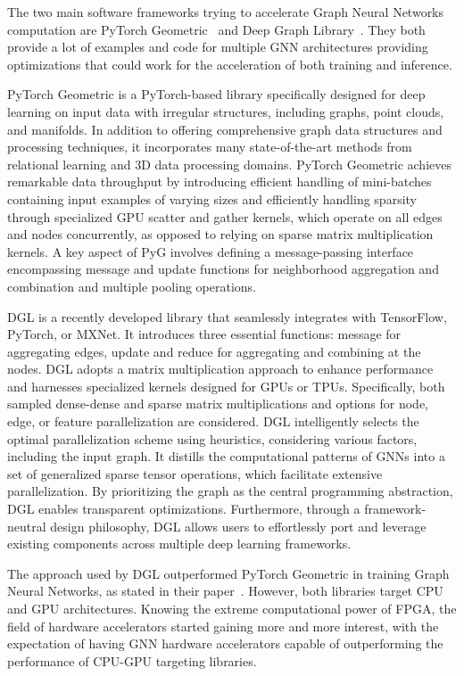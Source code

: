 The two main software frameworks trying to accelerate Graph Neural Networks computation are PyTorch Geometric~\cite{DBLP:journals/corr/abs-1903-02428} and Deep Graph Library~\cite{DBLP:journals/corr/abs-1909-01315}.
They both provide a lot of examples and code for multiple GNN architectures providing optimizations that could work for the acceleration of both training and inference.

PyTorch Geometric is a PyTorch-based library specifically designed for deep learning on input data with irregular structures, including graphs, point clouds, and manifolds.
In addition to offering comprehensive graph data structures and processing techniques, it incorporates many state-of-the-art methods from relational learning and 3D data processing domains.
PyTorch Geometric achieves remarkable data throughput by introducing efficient handling of mini-batches containing input examples of varying sizes and efficiently handling sparsity through specialized GPU scatter and gather kernels, which operate on all edges and nodes concurrently, as opposed to relying on sparse matrix multiplication kernels.
A key aspect of PyG involves defining a message-passing interface encompassing message and update functions for neighborhood aggregation and combination and multiple pooling operations.

DGL is a recently developed library that seamlessly integrates with TensorFlow, PyTorch, or MXNet.
It introduces three essential functions: message for aggregating edges, update and reduce for aggregating and combining at the nodes.
DGL adopts a matrix multiplication approach to enhance performance and harnesses specialized kernels designed for GPUs or TPUs.
Specifically, both sampled dense-dense and sparse matrix multiplications and options for node, edge, or feature parallelization are considered.
DGL intelligently selects the optimal parallelization scheme using heuristics, considering various factors, including the input graph.
It distills the computational patterns of GNNs into a set of generalized sparse tensor operations, which facilitate extensive parallelization.
By prioritizing the graph as the central programming abstraction, DGL enables transparent optimizations.
Furthermore, through a framework-neutral design philosophy, DGL allows users to effortlessly port and leverage existing components across multiple deep learning frameworks.

The approach used by DGL outperformed PyTorch Geometric in training Graph Neural Networks, as stated in their paper~\cite{DBLP:journals/corr/abs-1909-01315}.
However, both libraries target CPU and GPU architectures.
Knowing the extreme computational power of FPGA, the field of hardware accelerators started gaining more and more interest, with the expectation of having GNN hardware accelerators capable of outperforming the performance of CPU-GPU targeting libraries.

